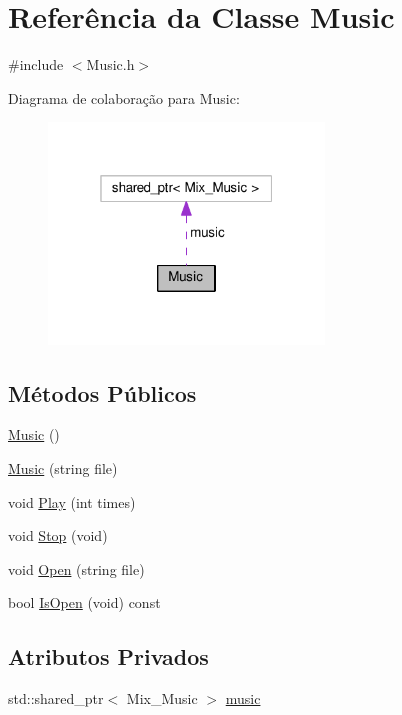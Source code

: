\hypertarget{classMusic}{\section{Referência da Classe Music}
\label{classMusic}
}


{\ttfamily \#include $<$Music.\+h$>$}



Diagrama de colaboração para Music\+:
\nopagebreak
\begin{figure}[H]
\begin{center}
\leavevmode
\includegraphics[width=208pt]{classMusic__coll__graph}
\end{center}
\end{figure}
\subsection*{Métodos Públicos}
\begin{DoxyCompactItemize}
\item 
\hyperlink{classMusic_ab5143f67c021bc77894c8e91de2b916b}{Music} ()
\item 
\hyperlink{classMusic_a769113513e796dd408b4deb7e758074d}{Music} (string file)
\item 
void \hyperlink{classMusic_a0b0eeff26dedfaab92bd127bce028b9a}{Play} (int times)
\item 
void \hyperlink{classMusic_a76ee0c7654f3048045e1f1b7fde334c3}{Stop} (void)
\item 
void \hyperlink{classMusic_ae13bd9609c4bb402a04f53ec07890aa3}{Open} (string file)
\item 
bool \hyperlink{classMusic_a7dd0d191e358d600f0ea8a1db75f833d}{Is\+Open} (void) const 
\end{DoxyCompactItemize}
\subsection*{Atributos Privados}
\begin{DoxyCompactItemize}
\item 
std\+::shared\+\_\+ptr$<$ Mix\+\_\+\+Music $>$ \hyperlink{classMusic_a6cddb36711f395497d2daf3e3c955912}{music}
\end{DoxyCompactItemize}


